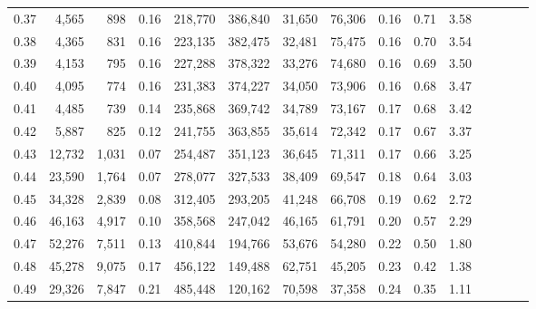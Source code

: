 \begin{tabular}{rrrcrrrrrrrrrrr}
0.37 &   4,565 &    898 &                                       0.16 &  218,770 &  386,840 &   31,650 &   76,306 &  0.16 &  0.71 &                         3.58 \\
0.38 &   4,365 &    831 &                                       0.16 &  223,135 &  382,475 &   32,481 &   75,475 &  0.16 &  0.70 &                         3.54 \\
0.39 &   4,153 &    795 &                                       0.16 &  227,288 &  378,322 &   33,276 &   74,680 &  0.16 &  0.69 &                         3.50 \\
0.40 &   4,095 &    774 &                                       0.16 &  231,383 &  374,227 &   34,050 &   73,906 &  0.16 &  0.68 &                         3.47 \\
0.41 &   4,485 &    739 &                                       0.14 &  235,868 &  369,742 &   34,789 &   73,167 &  0.17 &  0.68 &                         3.42 \\
0.42 &   5,887 &    825 &                                       0.12 &  241,755 &  363,855 &   35,614 &   72,342 &  0.17 &  0.67 &                         3.37 \\
0.43 &  12,732 &  1,031 &                                       0.07 &  254,487 &  351,123 &   36,645 &   71,311 &  0.17 &  0.66 &                         3.25 \\
0.44 &  23,590 &  1,764 &                                       0.07 &  278,077 &  327,533 &   38,409 &   69,547 &  0.18 &  0.64 &                         3.03 \\
0.45 &  34,328 &  2,839 &                                       0.08 &  312,405 &  293,205 &   41,248 &   66,708 &  0.19 &  0.62 &                         2.72 \\
0.46 &  46,163 &  4,917 &                                       0.10 &  358,568 &  247,042 &   46,165 &   61,791 &  0.20 &  0.57 &                         2.29 \\
0.47 &  52,276 &  7,511 &                                       0.13 &  410,844 &  194,766 &   53,676 &   54,280 &  0.22 &  0.50 &                         1.80 \\
0.48 &  45,278 &  9,075 &                                       0.17 &  456,122 &  149,488 &   62,751 &   45,205 &  0.23 &  0.42 &                         1.38 \\
0.49 &  29,326 &  7,847 &                                       0.21 &  485,448 &  120,162 &   70,598 &   37,358 &  0.24 &  0.35 &                         1.11 \\

\end{tabular}
